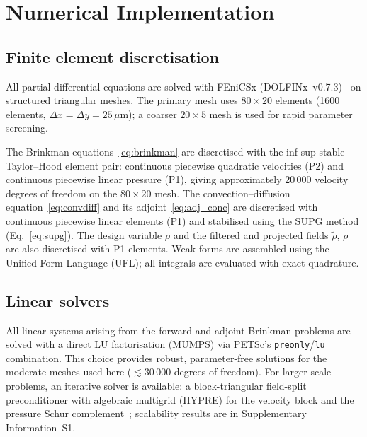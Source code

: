 \section{Numerical Implementation}
\label{sec:methods}

\subsection{Finite element discretisation}
\label{sec:fem}
All partial differential equations are solved with FEniCSx
(DOLFINx~v0.7.3)~\cite{fenicsx2022} on structured triangular meshes.
The primary mesh uses $80\times20$ elements
(1600 elements, $\Delta x = \Delta y = 25\,\mu$m);
a coarser $20\times5$ mesh is used for rapid parameter screening.

The Brinkman equations~\eqref{eq:brinkman} are discretised with the
inf-sup stable Taylor--Hood element pair: continuous piecewise quadratic
velocities (P2) and continuous piecewise linear pressure (P1), giving
approximately 20\,000 velocity degrees of freedom on the $80\times20$ mesh.
The convection--diffusion equation~\eqref{eq:convdiff} and its
adjoint~\eqref{eq:adj_conc} are discretised with continuous piecewise
linear elements (P1) and stabilised using the SUPG method
(Eq.~\eqref{eq:supg}).
The design variable $\rho$ and the filtered and projected fields
$\tilde\rho$, $\bar\rho$ are also discretised with P1 elements.
Weak forms are assembled using the Unified Form Language (UFL);
all integrals are evaluated with exact quadrature.

\subsection{Linear solvers}
All linear systems arising from the forward and adjoint Brinkman problems
are solved with a direct LU factorisation (MUMPS) via PETSc's
\texttt{preonly}/\texttt{lu} combination.
This choice provides robust, parameter-free solutions for the moderate
meshes used here ($\lesssim 30\,000$ degrees of freedom).
For larger-scale problems, an iterative solver is available: a
block-triangular field-split preconditioner with algebraic multigrid
(HYPRE) for the velocity block and the pressure Schur
complement~\cite{elman2014}; scalability results are in
Supplementary Information~S1.

